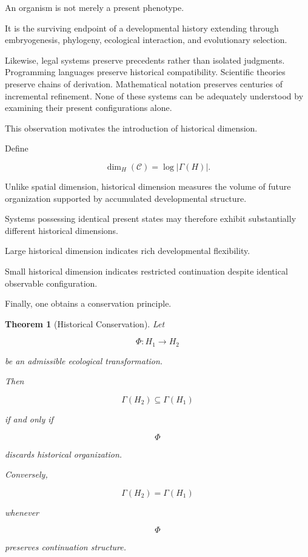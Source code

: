 \documentclass[12pt,oneside]{article}
\newtheorem{theorem}[definition]{Theorem}
\theoremstyle{remark}
\begin{document}
An organism is not merely a present phenotype.

It is the surviving endpoint of a developmental history extending through
embryogenesis, phylogeny, ecological interaction, and evolutionary selection.

Likewise, legal systems preserve precedents rather than isolated judgments.
Programming languages preserve historical compatibility. Scientific theories
preserve chains of derivation. Mathematical notation preserves centuries of
incremental refinement. None of these systems can be adequately understood by
examining their present configurations alone.

This observation motivates the introduction of historical dimension.

Define

\[
\dim_H(\mathcal C)
=
\log
|\Gamma(H)|.
\]

Unlike spatial dimension, historical dimension measures the volume of future
organization supported by accumulated developmental structure.

Systems possessing identical present states may therefore exhibit substantially
different historical dimensions.

Large historical dimension indicates rich developmental flexibility.

Small historical dimension indicates restricted continuation despite identical
observable configuration.

Finally, one obtains a conservation principle.

\begin{theorem}[Historical Conservation]

Let

\[
\Phi
:
H_1
\rightarrow
H_2
\]

be an admissible ecological transformation.

Then

\[
\Gamma(H_2)
\subseteq
\Gamma(H_1)
\]

if and only if

\[
\Phi
\]

discards historical organization.

Conversely,

\[
\Gamma(H_2)
=
\Gamma(H_1)
\]

whenever

\[
\Phi
\]

preserves continuation structure.

\end{theorem}
\end{document}
